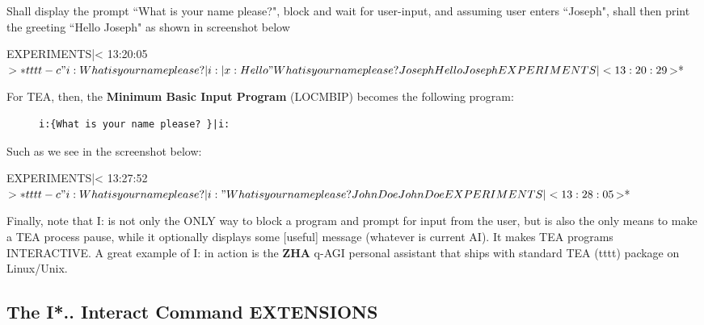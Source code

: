 \documentclass[a4paper, 18pt]{book} %
\begin{document}
Shall display the prompt ``What is your name please?", block and wait for user-input, and assuming user enters ``Joseph", shall then print the greeting ``Hello Joseph" as shown in screenshot below


  \begin{tcbverbatim}[title=I: EXAMPLE 7: Testing Interactive TEA program]
EXPERIMENTS|< 13:20:05 $>* tttt -c "i:{What is your name please? }|i:|x:{Hello }"
What is your name please? Joseph
Hello Joseph
EXPERIMENTS|< 13:20:29 $>*   
  \end{tcbverbatim}


For TEA, then, the \textbf{Minimum Basic Input Program} (LOCMBIP)\cite{lutalo2023dnapsoe} becomes the following program:


  
  \begin{figure}[H]
 \Large
  \centering
  \begin{tcolorbox}[teaterminalstyle, title=I: EXAMPLE 8: Minimum Basic Input Program (LOCMBIP): Name Prompt Program]
  \begin{lstlisting}[language=TEA]
i:{What is your name please? }|i:
   \end{lstlisting}
  \end{tcolorbox}
\end{figure} 


Such as we see in the screenshot below:




  \begin{tcbverbatim}[title=I: EXAMPLE 9: Testing Name Prompt TEA program]
EXPERIMENTS|< 13:27:52 $>* tttt -c "i:{What is your name please? }|i:"
What is your name please? John Doe
John Doe
EXPERIMENTS|< 13:28:05 $>*   
  \end{tcbverbatim}


Finally, note that I: is not only the ONLY way to block a program and prompt for input from the user, but is also the only means to make a TEA process pause, while it optionally displays some [useful] message (whatever is current AI). It makes TEA programs INTERACTIVE. A great example of I: in action is the \textbf{ZHA}\cite{lutalo2025unraveling} q-AGI personal assistant that ships with standard TEA (tttt) package on Linux/Unix.

  

  
  \subsection{The \textbf{I*..} Interact Command EXTENSIONS}
  
\end{document}
